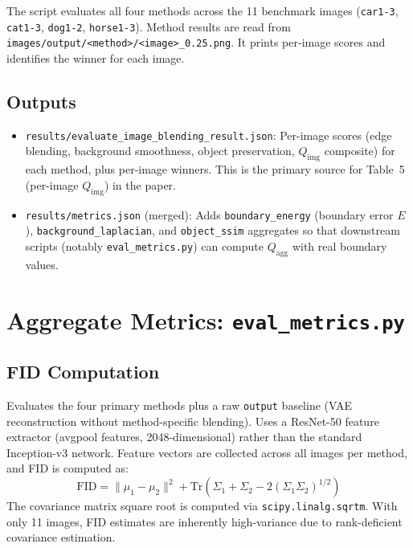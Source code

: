 \documentclass[11pt,a4paper]{article}
\begin{document}
The script evaluates all four methods across the 11 benchmark images (\texttt{car1-3}, \texttt{cat1-3}, \texttt{dog1-2}, \texttt{horse1-3}). Method results are read from \texttt{images/output/<method>/<image>\_0.25.png}. It prints per-image scores and identifies the winner for each image.

\subsection{Outputs}

\begin{itemize}
  \item \texttt{results/evaluate\_image\_blending\_result.json}: Per-image scores (edge blending, background smoothness, object preservation, $Q_{\text{img}}$ composite) for each method, plus per-image winners. This is the primary source for Table~5 (per-image $Q_{\text{img}}$) in the paper.
  \item \texttt{results/metrics.json} (merged): Adds \texttt{boundary\_energy} (boundary error $E$), \texttt{background\_laplacian}, and \texttt{object\_ssim} aggregates so that downstream scripts (notably \texttt{eval\_metrics.py}) can compute $Q_{\text{agg}}$ with real boundary values.
\end{itemize}

\section{Aggregate Metrics: \texttt{eval\_metrics.py}}

\subsection{FID Computation}

Evaluates the four primary methods plus a raw \texttt{output} baseline (VAE reconstruction without method-specific blending). Uses a ResNet-50 feature extractor (avgpool features, 2048-dimensional) rather than the standard Inception-v3 network. Feature vectors are collected across all images per method, and FID is computed as:
\begin{equation}
  \text{FID} = \|\mu_1 - \mu_2\|^2 + \text{Tr}\left(\Sigma_1 + \Sigma_2 - 2(\Sigma_1 \Sigma_2)^{1/2}\right)
\end{equation}
The covariance matrix square root is computed via \texttt{scipy.linalg.sqrtm}. With only 11 images, FID estimates are inherently high-variance due to rank-deficient covariance estimation.
\end{document}
